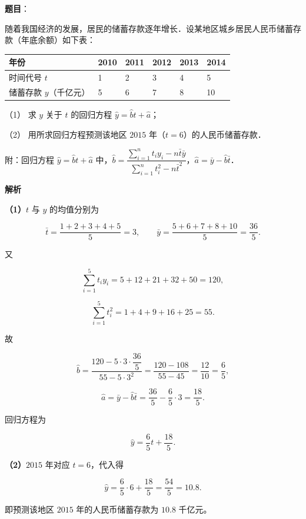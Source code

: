 \begin{answer}

\textbf{题目}：

随着我国经济的发展，居民的储蓄存款逐年增长．设某地区城乡居民人民币储蓄存款（年底余额）如下表：

\begin{center}
\begin{tabular}{llllll}
\toprule
年份 & 2010 & 2011 & 2012 & 2013 & 2014 \\
\midrule
时间代号 $t$ & 1 & 2 & 3 & 4 & 5 \\
储蓄存款 $y$（千亿元） & 5 & 6 & 7 & 8 & 10 \\
\bottomrule
\end{tabular}
\end{center}

（1） 求 $y$ 关于 $t$ 的回归方程 $\hat{y}=\hat{b}t+\hat{a}$；

（2） 用所求回归方程预测该地区 $2015$ 年（$t=6$）的人民币储蓄存款．

附：回归方程 $\hat{y}=\hat{b}t+\hat{a}$ 中，$\hat{b}=\dfrac{\sum\limits_{i=1}^{n}t_{i}y_{i}-n\bar{t}\bar{y}}{\sum\limits_{i=1}^{n}t_{i}^{2}-n\bar{t}^{2}}$，$\hat{a}=\bar{y}-\hat{b}\bar{t}$．

\textbf{解析}

\textbf{（1）}$t$ 与 $y$ 的均值分别为

\nopagebreak[4]
\[
\bar{t}=\frac{1+2+3+4+5}{5}=3,\qquad
\bar{y}=\frac{5+6+7+8+10}{5}=\frac{36}{5}.
\]

又

\nopagebreak[4]
\[
\sum_{i=1}^{5}t_{i}y_{i}=5+12+21+32+50=120,
\]

\nopagebreak[4]
\[
\sum_{i=1}^{5}t_{i}^{2}=1+4+9+16+25=55.
\]

故

\nopagebreak[4]
\[
\hat{b}=\frac{120-5\cdot 3\cdot\dfrac{36}{5}}{55-5\cdot 3^{2}}
=\frac{120-108}{55-45}
=\frac{12}{10}
=\frac{6}{5},
\]

\nopagebreak[4]
\[
\hat{a}=\bar{y}-\hat{b}\bar{t}
=\frac{36}{5}-\frac{6}{5}\cdot 3
=\frac{18}{5}.
\]

回归方程为

\nopagebreak[4]
\[
\hat{y}=\frac{6}{5}t+\frac{18}{5}.
\]

\textbf{（2）}$2015$ 年对应 $t=6$，代入得

\nopagebreak[4]
\[
\hat{y}=\frac{6}{5}\cdot 6+\frac{18}{5}
=\frac{54}{5}=10.8.
\]

即预测该地区 $2015$ 年的人民币储蓄存款为 $10.8$ 千亿元。



\end{answer}
